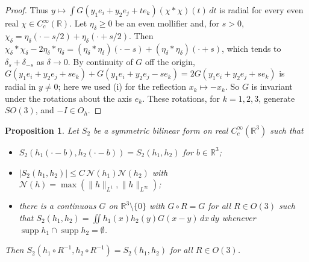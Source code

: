 \documentclass[11pt]{amsart}
\theoremstyle{plain}
\newtheorem{proposition}[theorem]{Proposition}
\theoremstyle{definition}
\theoremstyle{remark}
\numberwithin{equation}{section}
\newcommand{\R}{\mathbb{R}}
\newcommand{\Oh}{O_h}
\newcommand{\abs}[1]{\lvert #1\rvert}
\newcommand{\norm}[1]{\lVert #1\rVert}
\DeclareMathOperator{\supp}{supp}
\begin{document}
\begin{proof}
Thus $y\mapsto\int G(y_1e_i+y_2e_j+te_k)(\chi*\chi)(t)\,dt$ is radial for every even real $\chi\in C_c^\infty(\R)$. Let $\eta_\delta\ge0$ be an even mollifier and, for $s>0$, $\chi_\delta=\eta_\delta(\cdot-s/2)+\eta_\delta(\cdot+s/2)$. Then $\chi_\delta*\chi_\delta-2\eta_\delta*\eta_\delta=(\eta_\delta*\eta_\delta)(\cdot-s)+(\eta_\delta*\eta_\delta)(\cdot+s)$, which tends to $\delta_s+\delta_{-s}$ as $\delta\to0$. By continuity of $G$ off the origin, $G(y_1e_i+y_2e_j+se_k)+G(y_1e_i+y_2e_j-se_k)=2G(y_1e_i+y_2e_j+se_k)$ is radial in $y\ne0$; here we used (i) for the reflection $x_k\mapsto-x_k$. So $G$ is invariant under the rotations about the axis $e_k$. These rotations, for $k=1,2,3$, generate $SO(3)$, and $-I\in\Oh$.
\end{proof}

\begin{proposition}\label{prop:C2}
Let $S_2$ be a symmetric bilinear form on real $C_c^\infty(\R^3)$ such that
\begin{itemize}
\item[(i)] $S_2(h_1(\cdot-b),h_2(\cdot-b))=S_2(h_1,h_2)$ for $b\in\R^3$;
\item[(ii)] $\abs{S_2(h_1,h_2)}\le C\,\mathcal N(h_1)\mathcal N(h_2)$ with $\mathcal N(h)=\max(\norm h_{L^1},\norm h_{L^\infty})$;
\item[(iii)] there is a continuous $G$ on $\R^3\setminus\{0\}$ with $G\circ R=G$ for all $R\in O(3)$ such that $S_2(h_1,h_2)=\iint h_1(x)h_2(y)G(x-y)\,dx\,dy$ whenever $\supp h_1\cap\supp h_2=\emptyset$.
\end{itemize}
Then $S_2(h_1\circ R^{-1},h_2\circ R^{-1})=S_2(h_1,h_2)$ for all $R\in O(3)$.
\end{proposition}
\end{document}
